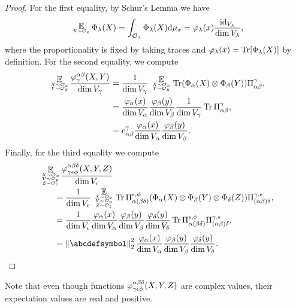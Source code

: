 \documentclass[notitlepage, 11pt, letterpaper]{amsart}
\begin{document}
\begin{proof}
    For the first equality, by Schur's Lemma we have
    \begin{equation}
        \tightsinglesubstack{\expect}{X \sim \orbit_{\ex}}\, \Phi_\yx(X) = \int_{\orbit_x} \Phi_\yx(X) \diff\mu_x = \vp_\yx(x) \frac{\id_{V_\yx}}{\dim V_\yx},
    \end{equation}
    where the proportionality is fixed by taking traces and $\varphi_\lambda(x)  = \operatorname{Tr}[\Phi_\lambda(X)]$ by definition.
    For the second equality, we compute
    \begin{align}
        \begin{split}
            \tightdoublesubstack{\expect}{X \sim \orbit_{\ex}}{Y \sim \orbit_{\ey}}\, \frac{\vp^{\ya \yb}_\yc(X, Y)}{\dim V_\yc}
            &= \frac{1}{\dim V_\yc} \tightdoublesubstack{\expect}{X \sim \orbit_{\ex}}{Y \sim \orbit_{\ey}}\, \Tr (\Phi_\ya(X) \ot \Phi_\yb(Y)) \Pi_{\ya \yb}^\yc, \\
            &= \frac{\vp_\ya(x)}{\dim V_\ya}\frac{\vp_\yb(y)}{\dim V_\yb} \frac{1}{\dim V_\yc} \Tr \Pi_{\ya \yb}^\yc, \\
            &= c_{\ya \yb}^\yc \frac{\vp_\ya(x)}{\dim V_\ya}\frac{\vp_\yb(y)}{\dim V_\yb}.
        \end{split}
    \end{align}
    Finally, for the third equality we compute
    \begin{align}
        \begin{split}
            &\tighttriplesubstack{\expect}{X \sim \orbit_{\ex}}{Y \sim \orbit_{\ey}}{Z \sim \orbit_{\ez}}\, \frac{\vp^{\ya \yb \yd}_{\yc \ye \yf}(X, Y, Z)}{\dim V_\ye}\\
            &\qquad=
            \frac{1}{{\dim V_\ye}} \tighttriplesubstack{\expect}{X \sim \orbit_{\ex}}{Y \sim \orbit_{\ey}}{Z \sim \orbit_{\ez}}\,
            \Tr \projr (\Phi_\ya(X) \ot \Phi_\yb(Y) \ot \Phi_\yd(Z))\projl, \\
            &\qquad=
            \frac{1}{{\dim V_\ye}}  \frac{\vp_\ya(x)}{\dim V_\ya}\frac{\vp_\yb(y)}{\dim V_\yb}
            \frac{\vp_\yd(y)}{\dim V_\yd} \Tr \projr \projl, \\
            &\qquad=
            \norm{\abcdefsymbol}_2^2 \frac{\vp_\ya(x)}{\dim V_\ya}\frac{\vp_\yb(y)}{\dim V_\yb}
            \frac{\vp_\yd(y)}{\dim V_\yd}.
        \end{split}
    \end{align}
\end{proof}
Note that even though functions $\varphi^{\alpha \beta \delta}_{\gamma \epsilon \phi}(X, Y, Z)$ are complex values, their expectation values are real and positive.
\end{document}

